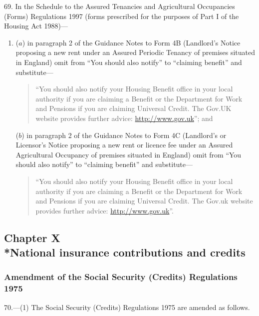 \documentclass[12pt,a4paper]{article}
\begin{document}
69.  In the Schedule to the Assured Tenancies and Agricultural Occupancies (Forms) Regulations 1997 (forms prescribed for the purposes of Part I of the Housing Act 1988)—
\begin{enumerate}\item[]
($a$) in paragraph 2 of the Guidance Notes to Form 4B (Landlord’s Notice proposing a new rent under an Assured Periodic Tenancy of premises situated in England) omit from “You should also notify” to “claiming benefit” and substitute—
\begin{quotation}
“You should also notify your Housing Benefit office in your local authority if you are claiming a Benefit or the Department for Work and Pensions if you are claiming Universal Credit. The Gov.UK website provides further advice: \url{http://www.gov.uk}”; and
\end{quotation}

($b$) in paragraph 2 of the Guidance Notes to Form 4C (Landlord’s or Licensor’s Notice proposing a new rent or licence fee under an Assured Agricultural Occupancy of premises situated in England) omit from “You should also notify” to “claiming benefit” and substitute—
\begin{quotation}
“You should also notify your Housing Benefit office in your local authority if you are claiming a Benefit or the Department for Work and Pensions if you are claiming Universal Credit. The Gov.uk website provides further advice: \url{http://www.gov.uk}”.
\end{quotation}
\end{enumerate}

\subsection[Chapter X --- National insurance contributions and credits]{Chapter X\\*National insurance contributions and credits}

\renewcommand\parthead{--- Part III Chapter X}

\subsubsection[70. Amendment of the Social Security (Credits) Regulations 1975]{Amendment of the Social Security (Credits) Regulations 1975}

70.—(1) The Social Security (Credits) Regulations 1975 are amended as follows.
\end{document}
